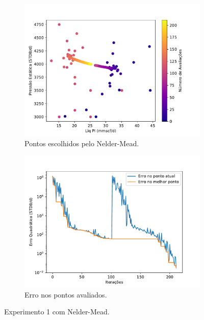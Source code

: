 \begin{figure}
\centering
\begin{subfigure}{0.5\textwidth}
  \centering
  \includegraphics[width=1\linewidth]{figs/setup1nm_eval_points.pdf}
  \caption{Pontos escolhidos pelo Nelder-Mead.}
  \label{fig:setup3_points}
\end{subfigure}%
\begin{subfigure}{0.5\textwidth}
  \centering
  \includegraphics[width=1\linewidth]{figs/setup1nm_errors.pdf}
  \caption{Erro nos pontos avaliados.}
  \label{fig:setup3_error}
\end{subfigure}
\caption{Experimento 1 com Nelder-Mead.}
\label{fig:setup3_2}
\end{figure}

